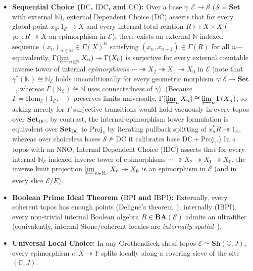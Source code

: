 \begin{itemize}
  \item \textbf{Sequential Choice ($\mathrm{DC}$, $\mathrm{IDC}$, and $\mathrm{CC}$):} Over a base $\gamma : \mathcal{E} \to \mathcal{S}$ ($\mathcal{S} = \mathbf{Set}$ with external $\mathbb{N}$), external Dependent Choice ($\mathrm{DC}$) asserts that for every global point $x_0 : 1_{\mathcal{E}} \to X$ and every internal total relation $R \rightarrowtail X \times X$ ($\mathrm{pr}_1 : R \twoheadrightarrow X$ an epimorphism in $\mathcal{E}$), there exists an external $\mathbb{N}$-indexed sequence $(x_n)_{n \in \mathbb{N}} \in \Gamma(X)^{\mathbb{N}}$ satisfying $(x_n, x_{n+1}) \in \Gamma(R)$ for all $n$---equivalently, $\Gamma(\varprojlim_{n \in \mathbb{N}} X_n) \twoheadrightarrow \Gamma(X_0)$ is surjective for every external countable inverse tower of internal \emph{epimorphisms} $\cdots \twoheadrightarrow X_2 \twoheadrightarrow X_1 \twoheadrightarrow X_0$ in $\mathcal{E}$ (note that $\gamma^*(\mathbb{N}) \cong \mathbb{N}_{\mathcal{E}}$ holds unconditionally for every geometric morphism $\gamma : \mathcal{E} \to \mathbf{Set}$~\cite[Prop.~A4.1.4]{Johnstone02}, whereas $\Gamma(\mathbb{N}_{\mathcal{E}}) \cong \mathbb{N}$ uses connectedness of $\gamma$). (Because $\Gamma = \mathrm{Hom}_{\mathcal{E}}(1_{\mathcal{E}}, -)$ preserves limits universally, $\Gamma(\varprojlim_n X_n) \cong \varprojlim_n \Gamma(X_n)$, so asking merely for $\Gamma$-surjective transitions would hold vacuously in every topos over $\mathbf{Set}_{\mathrm{DC}}$; by contrast, the internal-epimorphism tower formulation is equivalent over $\mathbf{Set}_{\mathrm{DC}}$ to $\mathrm{Proj}_1$ by iterating pullback splitting of $x_n^* R \twoheadrightarrow 1_{\mathcal{E}}$, whereas over choiceless bases $\mathcal{S} \not\models \mathrm{DC}$ it calibrates base $\mathrm{DC} + \mathrm{Proj}_1$.) In a topos with an $\mathrm{NNO}$, Internal Dependent Choice ($\mathrm{IDC}$) asserts that for every internal $\mathbb{N}_{\mathcal{E}}$-indexed inverse tower of epimorphisms $\cdots \twoheadrightarrow X_2 \twoheadrightarrow X_1 \twoheadrightarrow X_0$, the inverse limit projection $\varprojlim_{n \in \mathbb{N}_{\mathcal{E}}} X_n \twoheadrightarrow X_0$ is an epimorphism in $\mathcal{E}$ (and in every slice $\mathcal{E}/E$).

  \item \textbf{Boolean Prime Ideal Theorem ($\mathrm{BPI}$ and $\mathrm{IBPI}$):} Externally, every coherent topos has enough points (Deligne's theorem~\cite{Deligne72}); internally ($\mathrm{IBPI}$), every non-trivial internal Boolean algebra $B \in \mathbf{BA}(\mathcal{E})$ admits an ultrafilter (equivalently, internal Stone/coherent locales are \emph{internally spatial}~\cite{Johnstone82,Johnstone02}).

  \item \textbf{Universal Local Choice:} In any Grothendieck sheaf topos $\mathcal{E} \simeq \mathbf{Sh}(\mathbb{C}, J)$, every epimorphism $e: X \twoheadrightarrow Y$ splits locally along a covering sieve of the site $(\mathbb{C}, J)$.

\end{itemize}

